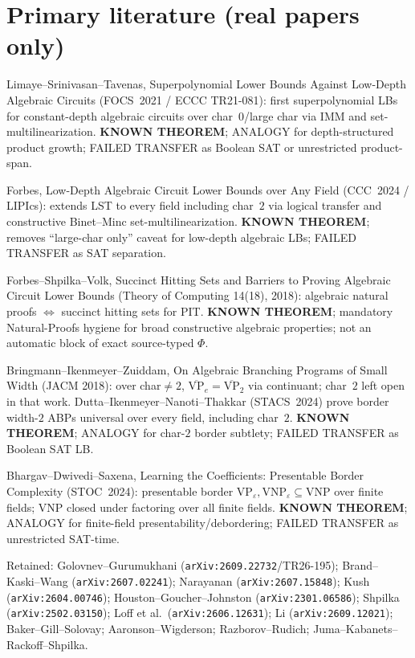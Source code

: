 \documentclass[11pt]{article}
\begin{document}
\section*{Primary literature (real papers only)}
Limaye--Srinivasan--Tavenas, Superpolynomial Lower Bounds Against Low-Depth Algebraic Circuits
(FOCS~2021 / ECCC TR21-081): first superpolynomial LBs for constant-depth algebraic circuits
over char~$0$/large char via IMM and set-multilinearization. \textbf{KNOWN THEOREM}; ANALOGY
for depth-structured product growth; FAILED TRANSFER as Boolean SAT or unrestricted product-span.

Forbes, Low-Depth Algebraic Circuit Lower Bounds over Any Field (CCC~2024 / LIPIcs):
extends LST to every field including char~$2$ via logical transfer and constructive
Binet--Minc set-multilinearization. \textbf{KNOWN THEOREM}; removes ``large-char only''
caveat for low-depth algebraic LBs; FAILED TRANSFER as SAT separation.

Forbes--Shpilka--Volk, Succinct Hitting Sets and Barriers to Proving Algebraic Circuit Lower
Bounds (Theory of Computing 14(18), 2018): algebraic natural proofs $\Leftrightarrow$ succinct
hitting sets for PIT. \textbf{KNOWN THEOREM}; mandatory Natural-Proofs hygiene for broad
constructive algebraic properties; not an automatic block of exact source-typed $\Phi$.

Bringmann--Ikenmeyer--Zuiddam, On Algebraic Branching Programs of Small Width (JACM 2018):
over char$\neq 2$, $\overline{\mathrm{VP}}_e=\overline{\mathrm{VP}}_2$ via continuant; char~$2$
left open in that work. Dutta--Ikenmeyer--Nanoti--Thakkar (STACS~2024) prove border width-$2$
ABPs universal over every field, including char~$2$. \textbf{KNOWN THEOREM}; ANALOGY for
char-$2$ border subtlety; FAILED TRANSFER as Boolean SAT LB.

Bhargav--Dwivedi--Saxena, Learning the Coefficients: Presentable Border Complexity
(STOC~2024): presentable border $\mathrm{VP}_\varepsilon,\mathrm{VNP}_\varepsilon\subseteq\mathrm{VNP}$
over finite fields; VNP closed under factoring over all finite fields. \textbf{KNOWN THEOREM};
ANALOGY for finite-field presentability/debordering; FAILED TRANSFER as unrestricted SAT-time.

Retained: Golovnev--Gurumukhani (\texttt{arXiv:2609.22732}/TR26-195); Brand--Kaski--Wang
(\texttt{arXiv:2607.02241}); Narayanan (\texttt{arXiv:2607.15848}); Kush (\texttt{arXiv:2604.00746});
Houston--Goucher--Johnston (\texttt{arXiv:2301.06586}); Shpilka (\texttt{arXiv:2502.03150});
Loff et al.\ (\texttt{arXiv:2606.12631}); Li (\texttt{arXiv:2609.12021}); Baker--Gill--Solovay;
Aaronson--Wigderson; Razborov--Rudich; Juma--Kabanets--Rackoff--Shpilka.
\end{document}
